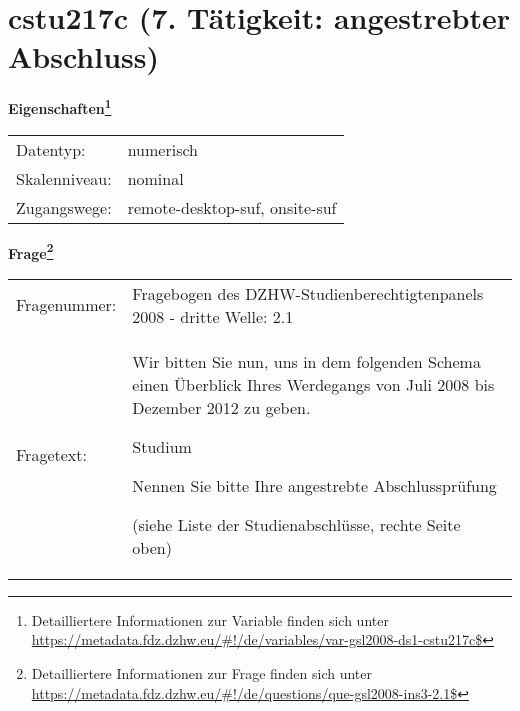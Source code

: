 
    \setcounter{footnote}{0}

    \vspace*{-1.8cm}
	\section{cstu217c (7. Tätigkeit: angestrebter Abschluss)}
	\label{section:cstu217c}



    \vspace*{0.5cm}
    \noindent\textbf{Eigenschaften\footnote{Detailliertere Informationen zur Variable finden sich unter
		\url{https://metadata.fdz.dzhw.eu/\#!/de/variables/var-gsl2008-ds1-cstu217c$}}}\\
	\begin{tabularx}{\hsize}{@{}lX}
	Datentyp: & numerisch \\
	Skalenniveau: & nominal \\
	Zugangswege: &
	  remote-desktop-suf, 
	  onsite-suf
 \\
    \end{tabularx}



				\vspace*{0.5cm}
                \noindent\textbf{Frage\footnote{Detailliertere Informationen zur Frage finden sich unter
		              \url{https://metadata.fdz.dzhw.eu/\#!/de/questions/que-gsl2008-ins3-2.1$}}}\\
				\begin{tabularx}{\hsize}{@{}lX}
					Fragenummer: &
					  Fragebogen des DZHW-Studienberechtigtenpanels 2008 - dritte Welle:
					  2.1
 \\
					Fragetext: & Wir bitten Sie nun, uns in dem folgenden Schema einen Überblick Ihres Werdegangs von Juli 2008 bis Dezember 2012 zu geben.\par  Studium\par  Nennen Sie bitte Ihre angestrebte Abschlussprüfung \par  (siehe Liste der Studienabschlüsse, rechte Seite oben) \\
				\end{tabularx}





